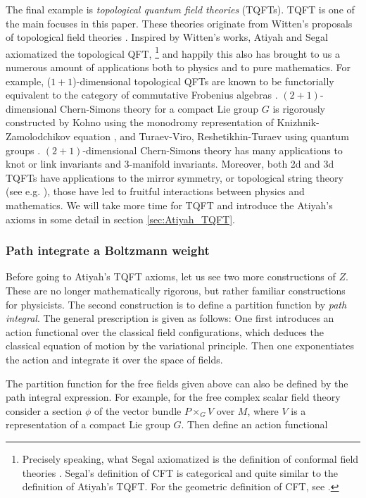 The final example is \emph{topological quantum field theories} (TQFTs).
TQFT is one of the main focuses in this paper. These theories
originate from Witten's proposals of topological field theories
\cite{Witten:1988xj, Witten:1988ze, Witten:1988hf}. Inspired by Witten's
works, Atiyah and Segal axiomatized the topological QFT,%
%
\footnote{Precisely speaking, what Segal axiomatized is the definition of conformal
field theories \cite{Segal:2002ei}. Segal's definition of CFT is categorical
and quite similar to the definition of Atiyah's TQFT.
For the geometric definition of CFT, see \cite{Friedan:1986ua}. }
%
and happily this also has brought to us a numerous amount of applications
both to physics and to pure mathematics. For example, ($1+1$)-dimensional
topological QFTs are known to be functorially equivalent to the category of commutative
Frobenius algebras \cite{MR2037238}. $(2+1)$-dimensional Chern-Simons theory for a
compact Lie group $G$ is rigorously constructed by Kohno \cite{MR1167165} using
the monodromy representation of Knizhnik-Zamolodchikov equation \cite{Knizhnik:1984nr},
and Turaev-Viro, Reshetikhin-Turaev using quantum groups \cite{Turaev:1992hq, Reshetikhin:1991tc}.
$(2+1)$-dimensional Chern-Simons theory has many
applications to knot or link invariants and $3$-manifold invariants.
Moreover, both 2d and 3d TQFTs have applications to the mirror symmetry,
or topological string theory (see e.g. \cite{Hori:2003ic}), those have led to fruitful interactions
between physics and mathematics. We will take more time for TQFT and
introduce the Atiyah's axioms in some detail in section \ref{sec:Atiyah_TQFT}.

\subsubsection*{Path integrate a Boltzmann weight}

Before going to Atiyah's TQFT axioms, let us see two more constructions
of $Z$. These are no longer mathematically rigorous, but rather familiar
constructions for physicists. The second construction is to define
a partition function by \emph{path integral}. The general prescription
is given as follows: One first introduces an action functional over
the classical field configurations, which deduces the classical equation
of motion by the variational principle. Then one exponentiates the
action and integrate it over the space of fields.

The partition function for the free fields given above can also be
defined by the path integral expression. For example, for the free
complex scalar field theory consider a section $\phi$ of the vector
bundle $P\times_{G}V$ over $M$, where $V$ is a representation of
a compact Lie group $G$. Then define an action functional

